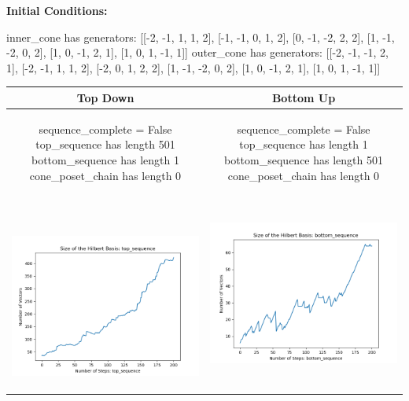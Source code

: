\documentclass[10pt]{article}
\begin{document}
\textbf{Initial Conditions:}
\begin{SAGE}
inner_cone has generators: 
[[-2, -1, 1, 1, 2], [-1, -1, 0, 1, 2], [0, -1, -2, 2, 2], [1, -1, -2, 0, 2], [1, 0, -1, 2, 1], [1, 0, 1, -1, 1]]
outer_cone has generators: 
[[-2, -1, -1, 2, 1], [-2, -1, 1, 1, 2], [-2, 0, 1, 2, 2], [1, -1, -2, 0, 2], [1, 0, -1, 2, 1], [1, 0, 1, -1, 1]]

\end{SAGE}
\begin{tabular}{c|c}
\textbf{Top Down} & \textbf{Bottom Up} \\ \hline  
\begin{SAGE}
	sequence_complete = False
	top_sequence has length 501
	bottom_sequence has length 1
	cone_poset_chain has length 0
\end{SAGE} 
&
\begin{SAGE}
	sequence_complete = False
	top_sequence has length 1
	bottom_sequence has length 501
	cone_poset_chain has length 0
\end{SAGE} 
\\ \hline
\
\begin{minipage}{.45\textwidth}
\includegraphics[width=\textwidth]{"DATA/5d/6 generators 2 bound B/top_sequence SIZE"}
\end{minipage} &
\begin{minipage}{.45\textwidth}
\includegraphics[width=\textwidth]{"DATA/5d/6 generators 2 bound B bottomup/bottom_sequence SIZE"}

\end{minipage}
\end{tabular}
\end{document}
